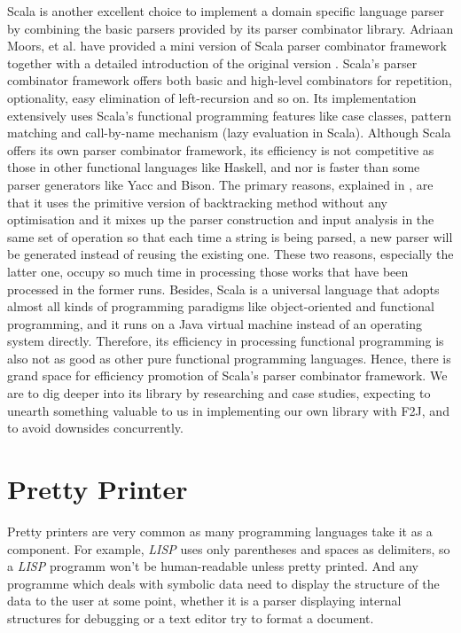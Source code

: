 Scala is another excellent choice to implement a domain specific language parser by combining the basic parsers provided by its parser combinator library. Adriaan Moors, et al. have provided a mini version of Scala parser combinator framework together with a detailed introduction of the original version \cite{Moors:2008}. Scala's parser combinator framework offers both basic and high-level combinators for repetition, optionality, easy elimination of left-recursion and so on. Its implementation extensively uses Scala's functional programming features like case classes, pattern matching and call-by-name mechanism (lazy evaluation in Scala). Although Scala offers its own parser combinator framework, its efficiency is not competitive as those in other functional languages like Haskell, and nor is faster than some parser generators like Yacc and Bison. The primary reasons, explained in \cite{Scala:2008}, are that it uses the primitive version of backtracking method without any optimisation and it mixes up the parser construction and input analysis in the same set of operation so that each time a string is being parsed, a new parser will be generated instead of reusing the existing one. These two reasons, especially the latter one, occupy so much time in processing those works that have been processed in the former runs.  Besides, Scala is a universal language that adopts almost all kinds of programming paradigms like object-oriented and functional programming, and it runs on a Java virtual machine instead of an operating system directly. Therefore, its efficiency in processing functional programming is also not as good as other pure functional programming languages. Hence, there is grand space for efficiency promotion of Scala's parser combinator framework. We are to dig deeper into its library by researching and case studies, expecting to unearth something valuable to us in implementing our own library with F2J, and to avoid downsides concurrently.

\section{Pretty Printer}

Pretty printers are very common as many programming languages take it as a component. For example, \textit{LISP} uses only parentheses and spaces as delimiters, so a \textit{LISP} programm won't be human-readable unless pretty printed. And any programme which deals with symbolic data need to display the structure of the data to the user at some point, whether it is a parser displaying internal structures for debugging or a text editor try to format a document.


